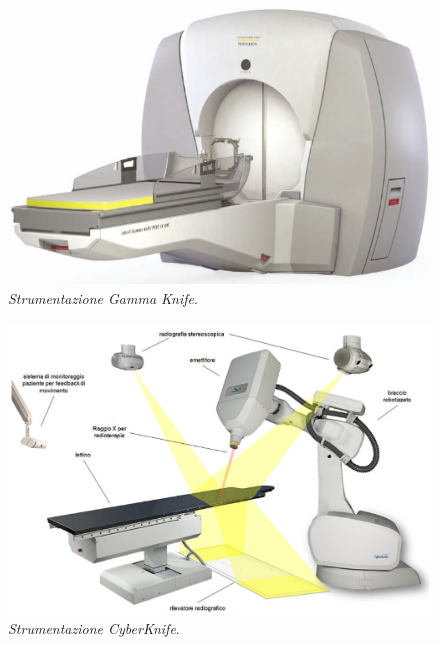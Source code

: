 \documentclass{report}
\numberwithin{equation}{section}
\numberwithin{figure}{section}
\begin{document}
\begin{figure}[htp]
\centering
\includegraphics[scale=0.68]{immagini/gammaknife.png}
\caption{\label{fig:gammaknife} \textit{Strumentazione Gamma Knife}.}
\end{figure}

\begin{figure}[H]
\centering
\includegraphics[scale=0.5]{immagini/cyberknife.png}
\caption{\label{fig:cyberknife} \textit{Strumentazione CyberKnife}.}
\end{figure}
\end{document}
